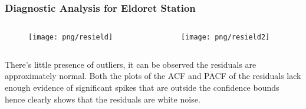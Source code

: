 \documentclass[]{beamer}
\begin{document}
\begin{frame}
	\frametitle{Diagnostic Analysis for Eldoret Station}
	\fontsize{5pt}{7.2}\selectfont
	\begin{columns}
		\hspace*{-2cm}
		\begin{column}[c]{4cm}
			\begin{figure}
				\texttt{[image: png/resield]}
			\end{figure}
		\end{column}
		\begin{column}[c]{4cm}
			\begin{figure}
				\texttt{[image: png/resield2]}
			\end{figure}
		\end{column}
	\end{columns}
There's little presence of outliers, it can be observed the residuals are approximately normal. Both the plots of the ACF and PACF of the residuals lack enough evidence of significant spikes that are outside the confidence bounds hence clearly shows that the residuals are white noise.
\end{frame}
\end{document}
